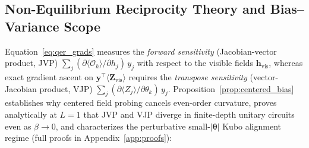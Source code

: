 \documentclass[11pt]{article}
\begin{document}
\subsection{Non-Equilibrium Reciprocity Theory and Bias--Variance Scope}
\label{sec:theory}
Equation~\eqref{eq:qer_grads} measures the \emph{forward sensitivity} (Jacobian-vector product, JVP) $\sum_j (\partial\langle \mathcal{O}_k\rangle / \partial h_j)\,y_j$ with respect to the visible fields $\mathbf{h}_{\text{vis}}$, whereas exact gradient ascent on $\mathbf{y}^\top\langle\mathbf{Z}_{\text{vis}}\rangle$ requires the \emph{transpose sensitivity} (vector-Jacobian product, VJP) $\sum_j (\partial\langle Z_j\rangle / \partial \theta_k)\,y_j$. Proposition~\ref{prop:centered_bias} establishes why centered field probing cancels even-order curvature, proves analytically at $L{=}1$ that JVP and VJP diverge in finite-depth unitary circuits even as $\beta{\to}0$, and characterizes the perturbative small-$|\boldsymbol{\theta}|$ Kubo alignment regime (full proofs in Appendix~\ref{app:proofs}):
\end{document}
